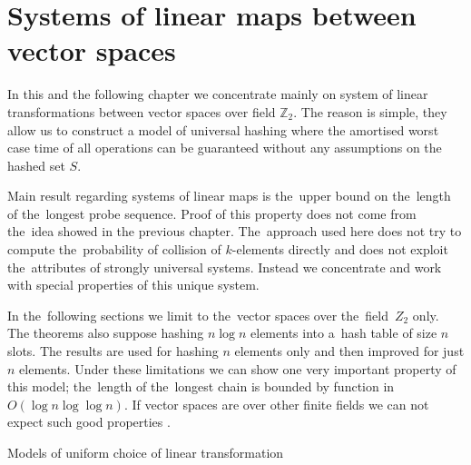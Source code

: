 \chapter{Systems of linear maps between vector spaces}
In this and the following chapter we concentrate mainly on system of linear transformations between vector spaces over field $\mathbb{Z}_2$. The reason is simple, they allow us to construct a model of universal hashing where the amortised worst case time of all operations can be guaranteed without any assumptions on the hashed set $S$. 

Main result regarding systems of linear maps is the~upper bound on the~length of the~longest probe sequence. Proof of this property does not come from the~idea showed in the previous chapter. The~approach used here does not try to compute the~probability of collision of $k$-elements directly and does not exploit the~attributes of strongly universal systems. Instead we concentrate and work with special properties of this unique system.

In the~following sections we limit to the~vector spaces over the~field~$Z_2$ only. The theorems also suppose hashing $n \log n$ elements into a~hash table of size $n$ slots. The results are used for hashing $n$ elements only and then improved for just $n$ elements. Under these limitations we can show one very important property of this model; the~length of the~longest chain is bounded by function in $O(\log n \log \log n)$. If vector spaces are over other finite fields we can not expect such good properties \cite{DBLP:journals/jacm/AlonDMPT99}.

\begin{section}{Models of uniform choice of linear transformation}
\end{section}

